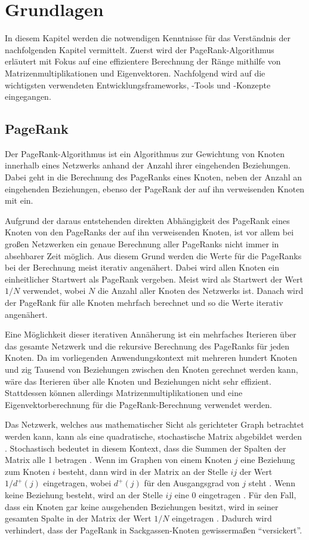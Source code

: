 \section{Grundlagen}
\label{sec:7-grundlagen}

In diesem Kapitel werden die notwendigen Kenntnisse für das Verständnis der nachfolgenden Kapitel vermittelt. Zuerst wird der PageRank-Algorithmus erläutert mit Fokus auf eine effizientere Berechnung der Ränge mithilfe von Matrizenmultiplikationen und Eigenvektoren. Nachfolgend wird auf die wichtigsten verwendeten Entwicklungsframeworks, -Tools und -Konzepte eingegangen.

\subsection{PageRank}
Der PageRank-Algorithmus ist ein Algorithmus zur Gewichtung von Knoten innerhalb eines Netzwerks anhand der Anzahl ihrer eingehenden Beziehungen. Dabei geht in die Berechnung des PageRanks eines Knoten, neben der Anzahl an eingehenden Beziehungen, ebenso der PageRank der auf ihn verweisenden Knoten mit ein. 

Aufgrund der daraus entstehenden direkten Abhängigkeit des PageRank eines Knoten von den PageRanks der auf ihn verweisenden Knoten, ist vor allem bei großen Netzwerken ein genaue Berechnung aller PageRanks nicht immer in absehbarer Zeit möglich. Aus diesem Grund werden die Werte für die PageRanks bei der Berechnung meist iterativ angenähert. Dabei wird allen Knoten ein einheitlicher Startwert als PageRank vergeben. Meist wird als Startwert der Wert $1/N$ verwendet, wobei $N$ die Anzahl aller Knoten des Netzwerks ist. Danach wird der PageRank für alle Knoten mehrfach berechnet und so die Werte iterativ angenähert.

Eine Möglichkeit dieser iterativen Annäherung ist ein mehrfaches Iterieren über das gesamte Netzwerk und die rekursive Berechnung des PageRanks für jeden Knoten. Da im vorliegenden Anwendungskontext mit mehreren hundert Knoten und zig Tausend von Beziehungen zwischen den Knoten gerechnet werden kann, wäre das Iterieren über alle Knoten und Beziehungen nicht sehr effizient. Stattdessen können allerdings Matrizenmultiplikationen und eine Eigenvektorberechnung für die PageRank-Berechnung verwendet werden.

Das Netzwerk, welches aus mathematischer Sicht als gerichteter Graph betrachtet werden kann, kann als eine quadratische, stochastische Matrix abgebildet werden \cite{pagerank_eigenvector}. Stochastisch bedeutet in diesem Kontext, dass die Summen der Spalten der Matrix alle 1 betragen \cite{pagerank_eigenvector}. Wenn im Graphen von einem Knoten $j$ eine Beziehung  zum Knoten $i$ besteht, dann wird in der Matrix an der Stelle $ij$ der Wert $1/d^{+}(j)$ eingetragen, wobei $d^{+}(j)$ für den Ausgangsgrad von $j$ steht \cite{pagerank_eigenvector}. Wenn keine Beziehung besteht, wird an der Stelle $ij$ eine 0 eingetragen \cite{pagerank_eigenvector}. Für den Fall, dass ein Knoten gar keine ausgehenden Beziehungen besitzt, wird in seiner gesamten Spalte in der Matrix der Wert $1/N$ eingetragen \cite{pagerank_eigenvector}. Dadurch wird verhindert, dass der PageRank in Sackgassen-Knoten gewissermaßen ``versickert''. 

